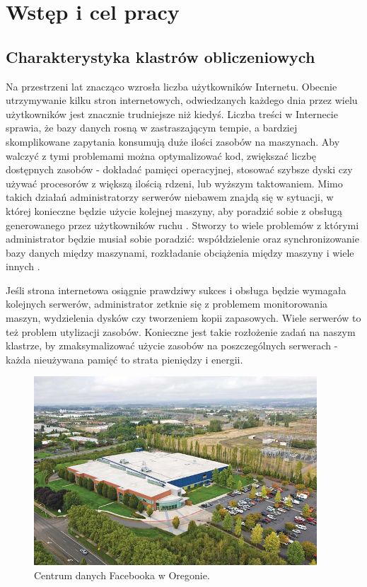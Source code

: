 \documentclass[10pt,a4paper,titlepage,twoside]{report}
\begin{document}
\newpage
{}
\onehalfspacing

\chapter{Wstęp i cel pracy}
\section{Charakterystyka klastrów obliczeniowych}
\indent \indent Na przestrzeni lat znacząco wzrosła liczba użytkowników Internetu\cite{ad1}. Obecnie utrzymywanie kilku stron internetowych, odwiedzanych każdego dnia przez wielu użytkowników jest znacznie trudniejsze niż kiedyś\cite{ad1}. Liczba treści w Internecie sprawia, że bazy danych rosną w zastraszającym tempie, a bardziej skomplikowane zapytania konsumują duże ilości zasobów na maszynach. Aby walczyć z tymi problemami można optymalizować kod, zwiększać liczbę dostępnych zasobów - dokładać pamięci operacyjnej, stosować szybsze dyski czy używać procesorów z większą ilością rdzeni, lub wyższym taktowaniem. Mimo takich działań administratorzy serwerów niebawem znajdą się w sytuacji, w której konieczne będzie użycie kolejnej maszyny, aby poradzić sobie z obsługą generowanego przez użytkowników ruchu \cite{ad2}. Stworzy to wiele problemów z którymi administrator będzie musiał sobie poradzić: współdzielenie oraz synchronizowanie bazy danych między maszynami, rozkładanie obciążenia między maszyny i wiele innych \cite{ad2}.

Jeśli strona internetowa osiągnie prawdziwy sukces i obsługa będzie wymagała kolejnych serwerów, administrator zetknie się z problemem monitorowania maszyn, wydzielenia dysków czy tworzeniem kopii zapasowych. Wiele serwerów to też problem utylizacji zasobów. Konieczne jest takie rozłożenie zadań na naszym klastrze, by zmaksymalizować użycie zasobów na poszczególnych serwerach - każda nieużywana pamięć to strata pieniędzy i energii\cite{ad3}.

\begin{figure}[ht!]
	\centering
	\includegraphics[scale=0.7]{pics/Selection_615.png}
	\caption{Centrum danych Facebooka w Oregonie.}
	\label{facebook_dc}
\end{figure}
\end{document}
